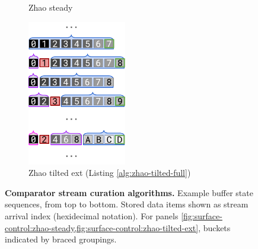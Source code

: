 \begin{figure}
\begin{subfigure}{0.25\linewidth}
\caption{Zhao steady \cite{zhao2005generalized}}
\label{fig:surface-control:zhao-steady}
\end{subfigure}%
\begin{subfigure}{0.25\linewidth}
\centering
\includegraphics[height=2.5in]{img/surface-control-zhao-tilted-ext}
\caption{Zhao tilted ext (Listing \ref{alg:zhao-tilted-full})}
\label{fig:surface-control:zhao-tilted-ext}
\end{subfigure}%

\caption{%
\textbf{Comparator stream curation algorithms.}
\footnotesize
Example buffer state sequences, from top to bottom.
Stored data items shown as stream arrival index (hexidecimal notation).
For panels \cref{fig:surface-control:zhao-steady,fig:surface-control:zhao-tilted-ext}, buckets indicated by braced groupings.
}
\label{fig:surface-control}

\end{figure}
